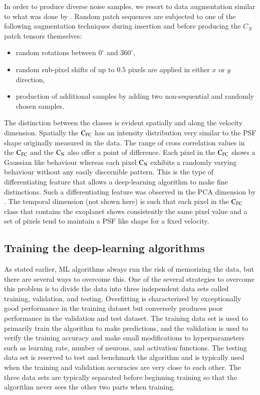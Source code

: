 \documentclass{aa}
\begin{document}
In order to produce diverse noise samples, we resort to data augmentation similar to what was done by \cite{2018Gomez}.
Random patch sequences are subjected to one of the following augmentation techniques during insertion and before producing the $C_{N}$ patch tensors themselves:
\begin{itemize}
    \item random %
    rotations between $0^{\circ}$ and $360^{\circ}$,
    \item random sub-pixel shifts of up to $0.5$ pixels are applied in either $x$ or $y$ direction,
    \item production of additional samples by adding two non-sequential and randomly chosen samples.
\end{itemize}
The distinction between the classes is evident spatially and along the velocity dimension.
Spatially the $\rm{C_{FC}}$ has an intensity distribution very similar to the PSF shape originally measured in the data.
The range of cross correlation values in the $\rm{C_{FC}}$ and the $\rm{C_N}$ also offer a point of difference.
Each pixel in the $\rm{C_{FC}}$ shows a Gaussian like behaviour whereas each pixel $\rm{C_{N}}$ exhibits a randomly varying behaviour without any easily discernible pattern.
This is the type of differentiating feature that allows a deep-learning algorithm to make fine distinctions.
Such a differentiating feature was observed in the PCA dimension by \cite{2018Gomez}.
The temporal dimension (not shown here) is such that each pixel in the $\rm{C_{FC}}$ class that contains the exoplanet shows consistently the same pixel value and a set of pixels tend to maintain a PSF like shape for a fixed velocity. 


\subsection{Training the deep-learning algorithms}

As stated earlier, ML algorithms always run the risk of memorizing the data, but there are several ways to overcome this.
One of the several strategies to overcome this problem is to divide the data into three independent data sets called training, validation, and testing.
Overfitting is characterized by exceptionally good performance in the training dataset but conversely produces poor performance in the validation and test dataset.
The training data set is used to primarily train the algorithm to make predictions, and the validation is used to verify the training accuracy and make small modifications to hyperparameters such as learning rate, number of neurons, and activation functions. %
The testing data set is reserved to test and benchmark the algorithm and is typically used when the training and validation accuracies are very close to each other.
The three data sets are typically separated before beginning training so that the algorithm never sees the other two parts when training.
\end{document}
